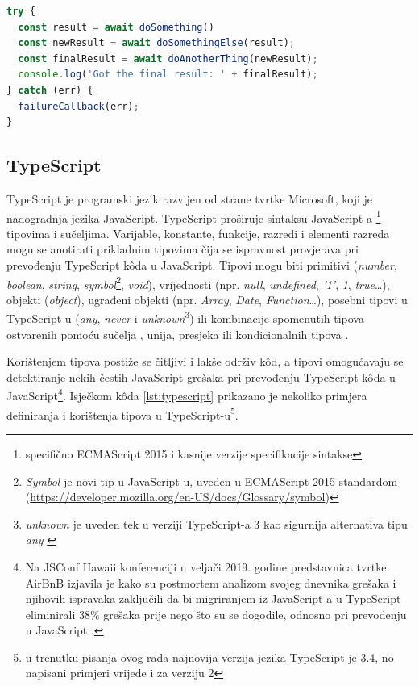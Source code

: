\documentclass[times, utf8, diplomski, numeric]{fer}
\newcommand{\razmakp}{\vspace{18pt}}
\newcommand{\razmaks}{\vspace{10pt}}
\begin{document}
\razmakp %
\begin{lstlisting}[language=JavaScript, caption={Primjer korištenja ECMAScript 2017 sintakse}, label={lst:await}]
try {
  const result = await doSomething()
  const newResult = await doSomethingElse(result);
  const finalResult = await doAnotherThing(newResult);
  console.log('Got the final result: ' + finalResult);
} catch (err) {
  failureCallback(err);
}
\end{lstlisting}
\razmaks


\newpage
\subsection{TypeScript} \label{sec:ts}

TypeScript je programski jezik razvijen od strane tvrtke Microsoft, koji je nadogradnja  jezika JavaScript.
TypeScript proširuje sintaksu JavaScript-a \footnote{specifično ECMAScript 2015 i kasnije verzije specifikacije sintakse} tipovima i sučeljima.
Varijable, konstante, funkcije, razredi i elementi razreda mogu se anotirati prikladnim tipovima čija se ispravnost provjerava pri prevođenju TypeScript kôda u JavaScript.
Tipovi mogu biti primitivi (\emph{number}, \emph{boolean}, \emph{string}, \emph{symbol}\footnote{
    \emph{Symbol} je novi tip u JavaScript-u, uveden u ECMAScript 2015 standardom (\url{https://developer.mozilla.org/en-US/docs/Glossary/symbol})
}, \emph{void}), vrijednosti (npr. \emph{null}, \emph{undefined}, \emph{'1'}, \emph{1}, \emph{true}…), objekti (\emph{object}), ugrađeni objekti (npr. \emph{Array}, \emph{Date}, \emph{Function}…), posebni  tipovi u TypeScript-u (\emph{any}, \emph{never} i \emph{unknown}\footnote{
    \emph{unknown} je uveden tek u verziji TypeScript-a 3 kao sigurnija alternativa tipu \emph{any} \citep{ts_hand}
}) ili kombinacije spomenutih tipova ostvarenih pomoću sučelja , unija, presjeka ili kondicionalnih tipova \citep{gh_ts_spec}\citep{ts_hand}.

Korištenjem tipova postiže se čitljivi i lakše održiv kôd, a tipovi omogućavaju se detektiranje nekih čestih JavaScript grešaka pri prevođenju TypeScript kôda u JavaScript\footnote{
    Na JSConf Hawaii konferenciji u veljači 2019. godine predstavnica tvrtke AirBnB izjavila je kako su postmortem analizom svojeg dnevnika grešaka i njihovih ispravaka zaključili da bi migriranjem iz JavaScript-a u TypeScript eliminirali 38\% grešaka prije nego što su se dogodile, odnosno pri prevođenju u JavaScript \citep{yt_ts}.
}.
Isječkom kôda \ref{lst:typescript} prikazano je nekoliko primjera definiranja i korištenja tipova  u TypeScript-u\footnote{
    u trenutku pisanja ovog rada najnovija verzija jezika TypeScript je 3.4, no napisani primjeri vrijede i za verziju 2
}.
\end{document}
